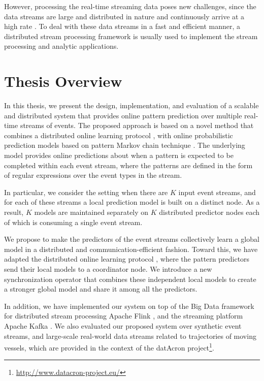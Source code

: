 \par However, processing the real-time streaming data poses new challenges, since the data streams are large and distributed in nature and continuously arrive at a high rate \cite{Babcock2002,Flouris2017}. To deal with these data streams in a fast and efficient manner, a distributed stream processing framework \cite{Spark,Flink,Storm} is usually used to implement the stream processing and analytic applications. 


\section{Thesis Overview}
\par In this thesis, we present the design, implementation, and evaluation of a scalable and distributed system that provides online pattern prediction over multiple real-time streams of events. The proposed approach is based on a novel method that combines a distributed online learning protocol \cite{kamp2014communication}, with online probabilistic prediction models based on pattern Markov chain technique \cite{alevizos2017event}. The underlying model provides online predictions about when a pattern is expected to be completed within each event stream, where the patterns are defined in the form of regular expressions over the event types in the stream.

\par In particular, we consider the setting when there are \emph{$K$} input event streams, and for each of these streams a local prediction model is built on a distinct node. As a result, \emph{$K$} models are maintained separately on \emph{$K$} distributed predictor nodes each of which is consuming a single event stream.


 \par We propose to make the predictors of the event streams collectively learn a global model in a distributed and communication-efficient fashion. Toward this, we have adapted the distributed online learning protocol \cite{kamp2014communication}, where the pattern predictors \cite{alevizos2017event} send their local models to a coordinator node. We introduce a new synchronization operator that combines these independent local models to create a stronger global model and share it among all the predictors.
  

\par In addition, we have implemented our system on top of the Big Data framework for distributed stream processing Apache Flink \cite{Flink}, and the streaming platform Apache Kafka \cite{Kafka}. We also evaluated our proposed system over synthetic event streams, and large-scale real-world data streams related to trajectories of moving vessels, which are provided in the context of the datAcron project\footnote{\url{http://www.datacron-project.eu/}}.\\

